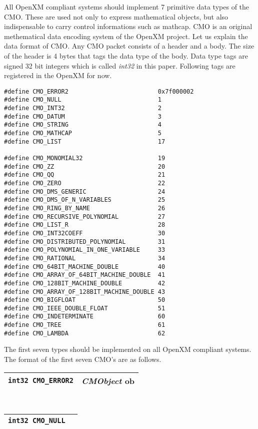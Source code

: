 All OpenXM compliant systems should implement 7 primitive data types
of the CMO.
These are used not only to express mathematical objects, but also
indispensable to carry control informations such as mathcap.
CMO is an original methematical data encoding system of the OpenXM project.
Let us explain the data format of CMO.
Any CMO packet consists of a header and a body.
The size of the header is 4 bytes that tags the data type of the body.
Data type tags are signed 32 bit integers which is called {\sl int32} in this
paper.
Following tags are registered in the OpenXM for now.
\begin{verbatim}
#define CMO_ERROR2                         0x7f000002
#define CMO_NULL                           1
#define CMO_INT32                          2
#define CMO_DATUM                          3
#define CMO_STRING                         4
#define CMO_MATHCAP                        5
#define CMO_LIST                           17

#define CMO_MONOMIAL32                     19
#define CMO_ZZ                             20
#define CMO_QQ                             21
#define CMO_ZERO                           22
#define CMO_DMS_GENERIC                    24
#define CMO_DMS_OF_N_VARIABLES             25
#define CMO_RING_BY_NAME                   26
#define CMO_RECURSIVE_POLYNOMIAL           27
#define CMO_LIST_R                         28
#define CMO_INT32COEFF                     30
#define CMO_DISTRIBUTED_POLYNOMIAL         31
#define CMO_POLYNOMIAL_IN_ONE_VARIABLE     33
#define CMO_RATIONAL                       34
#define CMO_64BIT_MACHINE_DOUBLE           40
#define CMO_ARRAY_OF_64BIT_MACHINE_DOUBLE  41
#define CMO_128BIT_MACHINE_DOUBLE          42
#define CMO_ARRAY_OF_128BIT_MACHINE_DOUBLE 43
#define CMO_BIGFLOAT                       50
#define CMO_IEEE_DOUBLE_FLOAT              51
#define CMO_INDETERMINATE                  60
#define CMO_TREE                           61
#define CMO_LAMBDA                         62
\end{verbatim}
The first seven types should be implemented on all OpenXM compliant systems.
The format of the first seven CMO's are as follows. \\
\begin{tabular}{|c|c|}
\hline
{\tt int32 CMO\_ERROR2} & {\sl CMObject} {\rm ob} \\ 
\hline
\end{tabular} \\
\begin{tabular}{|c|c|}
\hline
{\tt int32 CMO\_NULL}  \\ 
\hline
\end{tabular} \\
